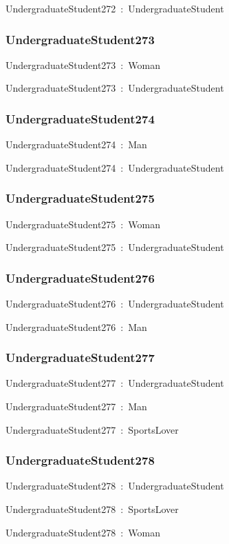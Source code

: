 \documentclass{article}
\begin{document}
UndergraduateStudent272~:~UndergraduateStudent

\subsubsection*{UndergraduateStudent273}

UndergraduateStudent273~:~Woman

UndergraduateStudent273~:~UndergraduateStudent

\subsubsection*{UndergraduateStudent274}

UndergraduateStudent274~:~Man

UndergraduateStudent274~:~UndergraduateStudent

\subsubsection*{UndergraduateStudent275}

UndergraduateStudent275~:~Woman

UndergraduateStudent275~:~UndergraduateStudent

\subsubsection*{UndergraduateStudent276}

UndergraduateStudent276~:~UndergraduateStudent

UndergraduateStudent276~:~Man

\subsubsection*{UndergraduateStudent277}

UndergraduateStudent277~:~UndergraduateStudent

UndergraduateStudent277~:~Man

UndergraduateStudent277~:~SportsLover

\subsubsection*{UndergraduateStudent278}

UndergraduateStudent278~:~UndergraduateStudent

UndergraduateStudent278~:~SportsLover

UndergraduateStudent278~:~Woman
\end{document}
